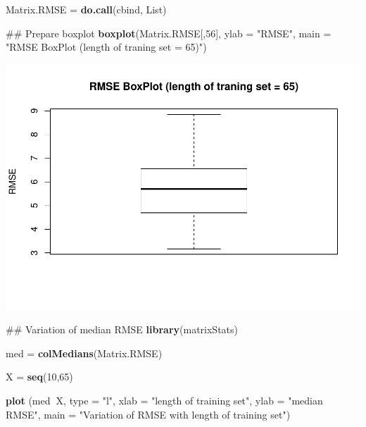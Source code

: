 \documentclass[a4paper, 12pt]{article}
\newenvironment{Shaded}{\begin{snugshade}}{\end{snugshade}}
\newcommand{\KeywordTok}[1]{\textcolor[rgb]{0.13,0.29,0.53}{\textbf{#1}}}
\newcommand{\DataTypeTok}[1]{\textcolor[rgb]{0.13,0.29,0.53}{#1}}
\newcommand{\DecValTok}[1]{\textcolor[rgb]{0.00,0.00,0.81}{#1}}
\newcommand{\StringTok}[1]{\textcolor[rgb]{0.31,0.60,0.02}{#1}}
\newcommand{\OperatorTok}[1]{\textcolor[rgb]{0.81,0.36,0.00}{\textbf{#1}}}
\newcommand{\NormalTok}[1]{#1}
\begin{document}
\begin{Shaded}
\begin{Highlighting}[]
\NormalTok{Matrix.RMSE =}\StringTok{ }\KeywordTok{do.call}\NormalTok{(cbind, List)}

\NormalTok{## Prepare boxplot}
\KeywordTok{boxplot}\NormalTok{(Matrix.RMSE[,}\DecValTok{56}\NormalTok{], }\DataTypeTok{ylab =} \StringTok{"RMSE"}\NormalTok{, }\DataTypeTok{main =} \StringTok{"RMSE BoxPlot (length of traning set = 65)"}\NormalTok{)}
\end{Highlighting}
\end{Shaded}

\includegraphics{Artigo_files/figure-latex/unnamed-chunk-5-1.pdf}

\begin{Shaded}
\begin{Highlighting}[]
\NormalTok{## Variation of median RMSE }
\KeywordTok{library}\NormalTok{(matrixStats)}

\NormalTok{med =}\StringTok{ }\KeywordTok{colMedians}\NormalTok{(Matrix.RMSE)}

\NormalTok{X =}\StringTok{ }\KeywordTok{seq}\NormalTok{(}\DecValTok{10}\NormalTok{,}\DecValTok{65}\NormalTok{)}

\KeywordTok{plot}\NormalTok{ (med}\OperatorTok{~}\NormalTok{X, }\DataTypeTok{type =} \StringTok{"l"}\NormalTok{, }\DataTypeTok{xlab =} \StringTok{"length of training set"}\NormalTok{, }\DataTypeTok{ylab =} \StringTok{"median RMSE"}\NormalTok{, }\DataTypeTok{main =} \StringTok{"Variation of RMSE with length of training set"}\NormalTok{)}
\end{Highlighting}
\end{Shaded}
\end{document}
